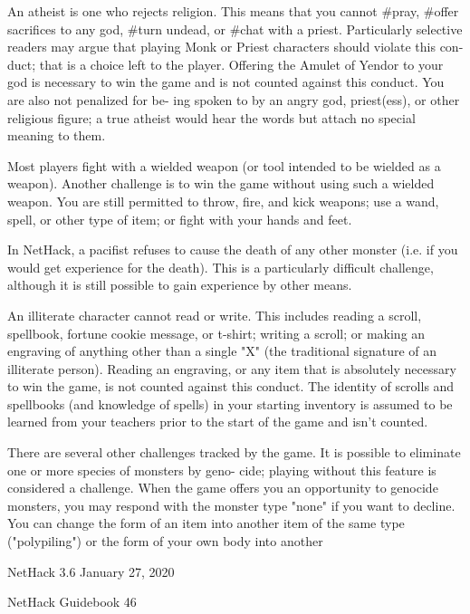 \documentclass[11pt]{article}
\begin{document}
   An atheist is one who rejects religion. This means that you
cannot \#pray, \#offer sacrifices to any god, \#turn undead, or
\#chat with a priest. Particularly selective readers may argue
that playing Monk or Priest characters should violate this con-
duct; that is a choice left to the player. Offering the Amulet
of Yendor to your god is necessary to win the game and is not
counted against this conduct. You are also not penalized for be-
ing spoken to by an angry god, priest(ess), or other religious
figure; a true atheist would hear the words but attach no special
meaning to them.

   Most players fight with a wielded weapon (or tool intended
to be wielded as a weapon). Another challenge is to win the game
without using such a wielded weapon. You are still permitted to
throw, fire, and kick weapons; use a wand, spell, or other type
of item; or fight with your hands and feet.

   In NetHack, a pacifist refuses to cause the death of any
other monster (i.e. if you would get experience for the death).
This is a particularly difficult challenge, although it is still
possible to gain experience by other means.

   An illiterate character cannot read or write. This includes
reading a scroll, spellbook, fortune cookie message, or t-shirt;
writing a scroll; or making an engraving of anything other than a
single "X" (the traditional signature of an illiterate person).
Reading an engraving, or any item that is absolutely necessary to
win the game, is not counted against this conduct. The identity
of scrolls and spellbooks (and knowledge of spells) in your
starting inventory is assumed to be learned from your teachers
prior to the start of the game and isn't counted.

   There are several other challenges tracked by the game. It
is possible to eliminate one or more species of monsters by geno-
cide; playing without this feature is considered a challenge.
When the game offers you an opportunity to genocide monsters, you
may respond with the monster type "none" if you want to decline.
You can change the form of an item into another item of the same
type ("polypiling") or the form of your own body into another


NetHack 3.6                   January 27, 2020





NetHack Guidebook                       46
\end{document}
